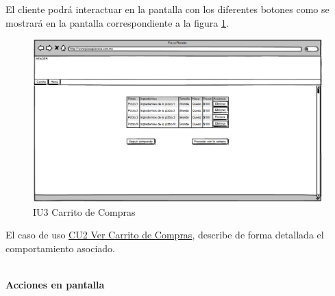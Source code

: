 El cliente podrá interactuar en la pantalla con los diferentes botones como se mostrará en la pantalla correspondiente a la figura \ref{IU3}.

\begin{figure}[h]
	
	\begin{center}				
		
		\includegraphics[scale=0.50]{./imagenes/IUs/RegistroSolicitantes/iu1-IniciarSesion/IU3-CarritoDeCompras.png}
		\caption{IU3 Carrito de Compras}
		\label{IU3}
		
	\end{center}
	
\end{figure}


El caso de uso \hyperlink{CU2}{CU2 Ver Carrito de Compras}, describe de forma detallada el comportamiento asociado.

\noindent \textbf{\\Acciones en pantalla}


